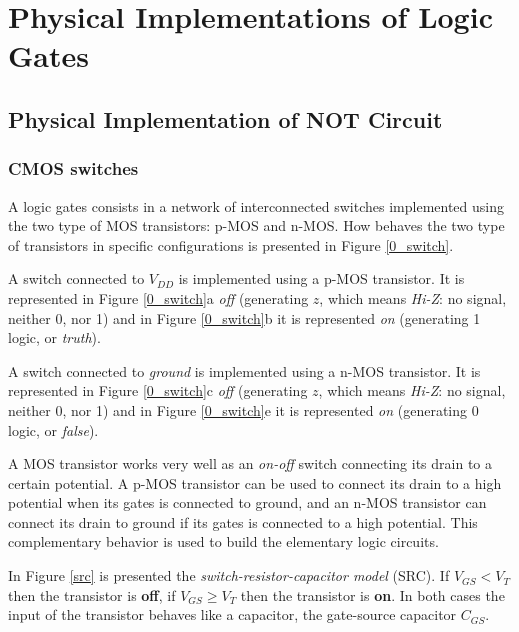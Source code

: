 \chapter{Physical Implementations of Logic Gates} \label{app:physical_implementations}


\section{Physical Implementation of NOT Circuit}

\subsection{CMOS switches}

A logic gates consists in a network of interconnected switches
implemented using the two type of MOS transistors: p-MOS and
n-MOS. How behaves the two type of transistors in specific
configurations is presented in Figure \ref{0_switch}.

A switch connected to $V_{DD}$ is implemented using a p-MOS
transistor. It is represented in Figure \ref{0_switch}a {\em off}
(generating $z$, which means {\em Hi-Z}: no signal, neither 0, nor
1) and in Figure \ref{0_switch}b it is represented {\em on}
(generating 1 logic, or {\em truth}).

A switch connected to {\em ground} is implemented using a n-MOS
transistor. It is represented in Figure \ref{0_switch}c {\em off}
(generating $z$, which means {\em Hi-Z}: no signal, neither 0, nor
1) and in Figure \ref{0_switch}e it is represented {\em on}
(generating 0 logic, or {\em false}).


A MOS transistor works very well as an {\em on-off} switch
connecting its drain to a certain potential.  A p-MOS transistor
can be used to connect its drain to a high potential when its
gates is connected to ground, and an n-MOS transistor can connect
its drain to ground if its gates is connected to a high potential.
This complementary behavior is used to build the elementary logic
circuits.

In Figure \ref{src} is presented the {\em switch-resistor-capacitor
model} (SRC). If $V_{GS} < V_{T}$ then the transistor is {\bf off}, if
$V_{GS} \geq V_{T}$ then the transistor is {\bf on}. In both cases the
input of the transistor behaves like a capacitor, the gate-source
capacitor $C_{GS}$.

